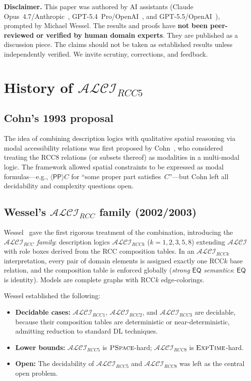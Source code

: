 \documentclass[
]{ceurart}
\theoremstyle{definition}
\newcommand{\ALCI}{\ensuremath{\mathcal{ALCI}}}
\newcommand{\ALCIRCC}[1]{\ensuremath{\mathcal{ALCI}_{\mathit{RCC#1}}}}
\newcommand{\EQ}{\ensuremath{\mathsf{EQ}}}
\newcommand{\PP}{\ensuremath{\mathsf{PP}}}
\newcommand{\EXPTIME}{\textsc{ExpTime}}
\newcommand{\PSPACE}{\textsc{PSpace}}
\begin{document}
\textbf{Disclaimer.}
This paper was authored by AI assistants
(Claude Opus~4.7/Anthropic~\cite{ClaudeOpus47},
GPT-5.4~Pro/OpenAI~\cite{GPT54Pro}, and
GPT-5.5/OpenAI~\cite{GPT55Repaired}), prompted by Michael Wessel.
The results and proofs have \textbf{not been peer-reviewed or verified by
human domain experts}.  They are published as a discussion piece.
The claims should not be taken as established results unless independently
verified.  We invite scrutiny, corrections, and feedback.

\section{History of $\ALCIRCC{5}$}
\label{sec:history}

\subsection{Cohn's 1993 proposal}

The idea of combining description logics with qualitative spatial
reasoning via modal accessibility relations was first proposed by
Cohn~\cite{Cohn1993}, who considered treating the RCC8 relations
(or subsets thereof) as modalities in a multi-modal logic.
The framework allowed spatial constraints to be expressed as
modal formulas---e.g., $\langle \PP \rangle C$ for ``some proper
part satisfies~$C$''---but Cohn left all decidability and complexity
questions open.

\subsection{Wessel's $\ALCIRCC{}$ family (2002/2003)}

Wessel~\cite{Wessel2002,Wessel2003,Wessel2001} gave the first rigorous treatment
of the combination, introducing the \emph{$\ALCIRCC{}$ family}:
description logics $\ALCIRCC{k}$ ($k = 1,2,3,5,8$) extending $\ALCI$
with role boxes derived from the RCC composition tables.
In an $\ALCIRCC{k}$ interpretation, every pair of domain elements is
assigned exactly one RCC$k$ base relation, and the composition table
is enforced globally (\emph{strong $\EQ$ semantics}: $\EQ$ is identity).
Models are complete graphs with RCC$k$ edge-colorings.

Wessel established the following:
\begin{itemize}
  \item \textbf{Decidable cases:} $\ALCIRCC{1}$, $\ALCIRCC{2}$,
    and $\ALCIRCC{3}$ are decidable, because their composition
    tables are deterministic or near-deterministic, admitting
    reduction to standard DL techniques.
  \item \textbf{Lower bounds:} $\ALCIRCC{5}$ is $\PSPACE$-hard;
    $\ALCIRCC{8}$ is $\EXPTIME$-hard.
  \item \textbf{Open:} The decidability of $\ALCIRCC{5}$ and
    $\ALCIRCC{8}$ was left as the central open problem.
\end{itemize}
\end{document}
